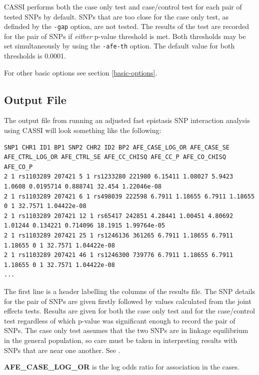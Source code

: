 \documentclass[a4paper,12pt]{article}
\newcommand{\code}[1]{{\footnotesize{{\tt #1}}}}
\begin{document}
CASSI performs both the case only test and case/control test for each pair of tested SNPs by default. SNPs that are too close for the case only test, as definded by the \code{-gap} option, are not tested. The results of the test are recorded for the pair of SNPs if {\it either} p-value threshold is met. Both thresholds may be set simultaneously by using the \code{-afe-th} option. The default value for both thresholds is 0.0001. 

For other basic options see  section \ref{basic-options}. 


\subsection{Output File}
\label{afe-output}

The output file from running an adjusted fast epistasis SNP interaction analysis using CASSI will look something like the following: 
\vspace{0.35cm} \begin{lstlisting}
SNP1 CHR1 ID1 BP1 SNP2 CHR2 ID2 BP2 AFE_CASE_LOG_OR AFE_CASE_SE AFE_CTRL_LOG_OR AFE_CTRL_SE AFE_CC_CHISQ AFE_CC_P AFE_CO_CHISQ AFE_CO_P
2 1 rs1103289 207421 5 1 rs1233280 221980 6.15411 1.08027 5.9423 1.0608 0.0195714 0.888741 32.454 1.22046e-08
2 1 rs1103289 207421 6 1 rs498039 222598 6.7911 1.18655 6.7911 1.18655 0 1 32.7571 1.04422e-08
2 1 rs1103289 207421 12 1 rs65417 242851 4.28441 1.00451 4.80692 1.01244 0.134221 0.714096 18.1915 1.99764e-05
2 1 rs1103289 207421 25 1 rs1246136 361265 6.7911 1.18655 6.7911 1.18655 0 1 32.7571 1.04422e-08
2 1 rs1103289 207421 46 1 rs1246300 739776 6.7911 1.18655 6.7911 1.18655 0 1 32.7571 1.04422e-08
...

\end{lstlisting} \vspace{0.35cm}
The first line is a header labelling the columns of the results file. The SNP details for the pair of SNPs are given firstly followed by values calculated from the joint effects tests. Results are given for both the case only test and for the case/control test regardless of which p-value was significant enough to record the pair of SNPs. The case only test assumes that the two SNPs are in linkage equilibrium in the general population, so care must be taken in interpreting results with SNPs that are near one another. See \citet{ueki:etal:12}. 

{\bf AFE\_CASE\_LOG\_OR} is the log odds ratio for association in the cases. 
\end{document}
